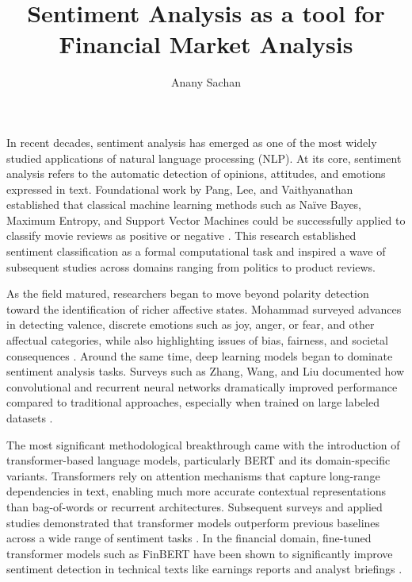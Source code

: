 \documentclass[12pt]{article}
\title{\textbf{Sentiment Analysis as a tool for Financial Market Analysis}}
\author{Anany Sachan}
\begin{document}
\maketitle

In recent decades, sentiment analysis has emerged as one of the most widely studied applications of 
natural language processing (NLP). At its core, sentiment analysis refers to the automatic detection of 
opinions, attitudes, and emotions expressed in text. Foundational work by Pang, Lee, and Vaithyanathan 
established that classical machine learning methods such as Naïve Bayes, Maximum Entropy, and Support 
Vector Machines could be successfully applied to classify movie reviews as positive or negative 
\cite{10.3115/1118693.1118704}. This research established sentiment classification as a formal 
computational task and inspired a wave of subsequent studies across domains ranging from politics to 
product reviews.

As the field matured, researchers began to move beyond polarity detection toward the identification of 
richer affective states. Mohammad surveyed advances in detecting valence, discrete emotions such as joy, 
anger, or fear, and other affectual categories, while also highlighting issues of bias, fairness, and 
societal consequences \cite{SentimentEmotionSurvey2021}. Around the same time, deep learning models 
began to dominate sentiment analysis tasks. Surveys such as Zhang, Wang, and Liu documented how 
convolutional and recurrent neural networks dramatically improved performance compared to traditional 
approaches, especially when trained on large labeled datasets \cite{10.1002/widm.1253}.

The most significant methodological breakthrough came with the introduction of transformer-based 
language models, particularly BERT and its domain-specific variants. Transformers rely on attention 
mechanisms that capture long-range dependencies in text, enabling much more accurate contextual 
representations than bag-of-words or recurrent architectures. Subsequent surveys and applied studies 
demonstrated that transformer models outperform previous baselines across a wide range of sentiment 
tasks \cite{10.1145/3586075,10.1145/3650215.3650260}. In the financial domain, fine-tuned transformer 
models such as FinBERT have been shown to significantly improve sentiment detection in technical texts 
like earnings reports and analyst briefings \cite{10.1145/3543873.3587605,araci2019finbert}.
\end{document}
